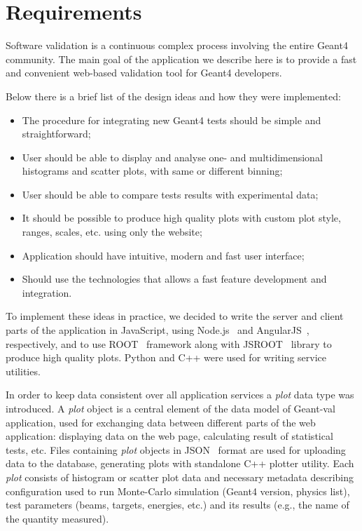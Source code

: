 \section{Requirements}
\label{sec:requirements}

Software validation is a continuous complex process involving the entire Geant4 community. The main goal of the application we describe here is to provide a fast and convenient web-based validation tool for Geant4 developers.

Below there is a brief list of the design ideas
and how they were implemented:
\begin{itemize}
    \item The procedure for integrating new Geant4 tests should be simple and straightforward;
    \item User should be able to display and analyse one- and multidimensional histograms and scatter plots, with same or different binning;
    \item User should be able to compare tests results with experimental data;
    \item It should be possible to produce high quality plots with custom plot style, ranges, scales, etc. using only the website;
    \item Application should have intuitive, modern and fast user interface;
    \item Should use the technologies that allows a fast feature development and integration.
\end{itemize}

To implement these ideas in practice, we decided to write the server and client parts of the application in JavaScript, using Node.js~\cite{NodeJS} and AngularJS~\cite{AngularJS}, respectively, and to use ROOT~\cite{ROOT} framework along with JSROOT~\cite{JSROOT} library to produce high quality plots. Python and C++ were used for writing service utilities.

In order to keep data consistent over all application services a \textit{plot} data type was introduced. A \textit{plot} object is a central element of the data model of \textsf{Geant-val} application, used for exchanging data between different parts of the web application: displaying data on the web page, calculating result of statistical tests, etc. Files containing \textit{plot} objects in JSON~\cite{json} format are used for uploading data to the database, generating plots with standalone C++ plotter utility. 
Each \textit{plot} consists of histogram or scatter plot data and necessary metadata describing configuration used to run Monte-Carlo simulation (Geant4 version, physics list), test parameters (beams, targets, energies, etc.) and its results (e.g., the name of the quantity measured).

